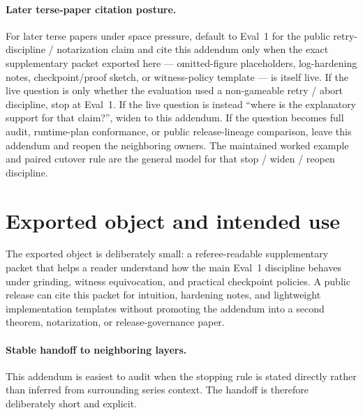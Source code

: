 \documentclass[11pt]{article}
\begin{document}
\paragraph{Later terse-paper citation posture.}
For later terse papers under space pressure, default to Eval~1 for the public retry-discipline / notarization claim and cite this addendum only when the exact supplementary packet exported here --- omitted-figure placeholders, log-hardening notes, checkpoint/proof sketch, or witness-policy template --- is itself live.
If the live question is only whether the evaluation used a non-gameable retry / abort discipline, stop at Eval~1.
If the live question is instead ``where is the explanatory support for that claim?'', widen to this addendum.
If the question becomes full audit, runtime-plan conformance, or public release-lineage comparison, leave this addendum and reopen the neighboring owners.
The maintained worked example and paired cutover rule are the general model for that stop / widen / reopen discipline.\cite{series:workedexample,series:pairedterminalcutoverrules}


\section{Exported object and intended use}
The exported object is deliberately small: a referee-readable supplementary packet that helps a reader understand how the main Eval~1 discipline behaves under grinding, witness equivocation, and practical checkpoint policies.
A public release can cite this packet for intuition, hardening notes, and lightweight implementation templates without promoting the addendum into a second theorem, notarization, or release-governance paper.

\paragraph{Stable handoff to neighboring layers.}
This addendum is easiest to audit when the stopping rule is stated directly rather than inferred from surrounding series context.
The handoff is therefore deliberately short and explicit.
\end{document}

